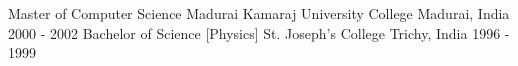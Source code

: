 \begin{cventries}
  \cventry
    {Master of Computer Science}
    {Madurai Kamaraj University College}
    {Madurai, India }
    {2000 - 2002}
    {      
    }
  \cventry
  {Bachelor of Science [Physics]}
  {St. Joseph’s College}
  {Trichy, India}
  {1996 - 1999}
  {
  }
\end{cventries}